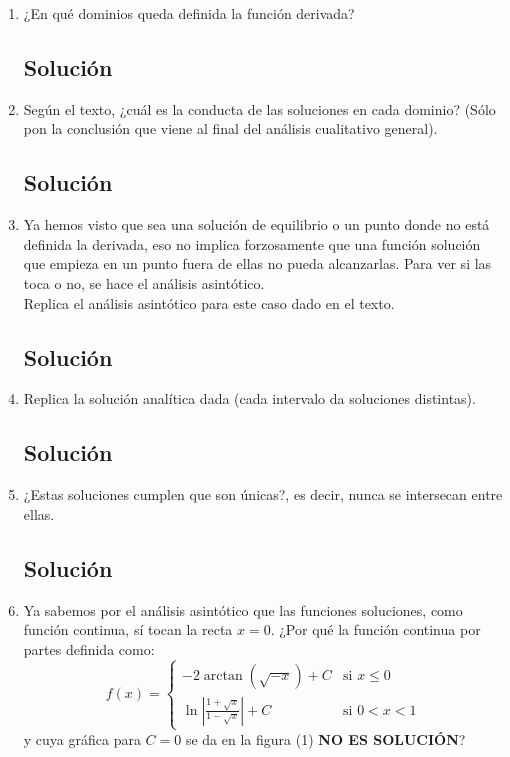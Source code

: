 \begin{enumerate}[label=\arabic*., leftmargin=*]
\begin{enumerate}[label=(\alph*), leftmargin=*]
        \item ¿En qué dominios queda definida la función derivada?
        \subsection*{Solución}

        \item Según el texto, ¿cuál es la conducta de las soluciones en cada dominio? (Sólo pon la conclusión que viene al final del análisis cualitativo general).
        \subsection*{Solución}

        \item Ya hemos visto que sea una solución de equilibrio o un punto donde no está definida la derivada, eso no implica forzosamente que una función solución que empieza en un punto fuera de ellas no pueda alcanzarlas. Para ver si las toca o no, se hace el análisis asintótico. \\
        Replica el análisis asintótico para este caso dado en el texto.
        \subsection*{Solución}

        \item Replica la solución analítica dada (cada intervalo da soluciones distintas).
        \subsection*{Solución}

        \item ¿Estas soluciones cumplen que son únicas?, es decir, nunca se intersecan entre ellas.
        \subsection*{Solución}

        \item Ya sabemos por el análisis asintótico que las funciones soluciones, como función continua, sí tocan la recta $x=0$. ¿Por qué la función continua por partes definida como:
        \[
        f(x) = \begin{cases} 
        -2\arctan(\sqrt{-x}) + C & \text{si } x \le 0 \\[8pt]
        \ln\left|\frac{1+\sqrt{x}}{1-\sqrt{x}}\right| + C & \text{si } 0 < x < 1 
        \end{cases}
        \]
        y cuya gráfica para $C=0$ se da en la figura (1) \textbf{NO ES SOLUCIÓN}?


\end{enumerate}
\end{enumerate}
